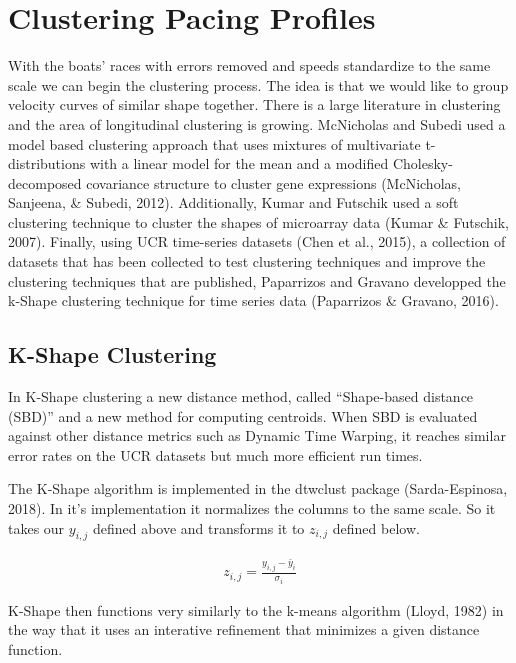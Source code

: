 \documentclass[11pt,]{article}
\begin{document}
\section{Clustering Pacing Profiles}\label{clustering-pacing-profiles}

With the boats' races with errors removed and speeds standardize to the
same scale we can begin the clustering process. The idea is that we
would like to group velocity curves of similar shape together. There is
a large literature in clustering and the area of longitudinal clustering
is growing. McNicholas and Subedi used a model based clustering approach
that uses mixtures of multivariate t-distributions with a linear model
for the mean and a modified Cholesky-decomposed covariance structure to
cluster gene expressions (McNicholas, Sanjeena, \& Subedi, 2012).
Additionally, Kumar and Futschik used a soft clustering technique to
cluster the shapes of microarray data (Kumar \& Futschik, 2007).
Finally, using UCR time-series datasets (Chen et al., 2015), a
collection of datasets that has been collected to test clustering
techniques and improve the clustering techniques that are published,
Paparrizos and Gravano developped the k-Shape clustering technique for
time series data (Paparrizos \& Gravano, 2016).

\subsection{K-Shape Clustering}\label{k-shape-clustering}

In K-Shape clustering a new distance method, called ``Shape-based
distance (SBD)'' and a new method for computing centroids. When SBD is
evaluated against other distance metrics such as Dynamic Time Warping,
it reaches similar error rates on the UCR datasets but much more
efficient run times.

The K-Shape algorithm is implemented in the dtwclust package
(Sarda-Espinosa, 2018). In it's implementation it normalizes the columns
to the same scale. So it takes our \(y_{i,j}\) defined above and
transforms it to \(z_{i,j}\) defined below.

\begin{align*}
    z_{i,j} = \frac{y_{i,j} - \bar{y}_{i}}{\sigma_{i}}
\end{align*}

K-Shape then functions very similarly to the k-means algorithm (Lloyd,
1982) in the way that it uses an interative refinement that minimizes a
given distance function.
\end{document}
